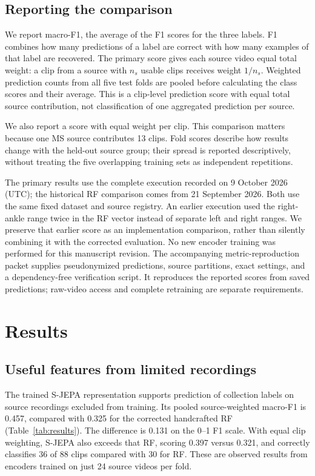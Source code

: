 \documentclass[10pt,twocolumn,letterpaper]{article}
\begin{document}
\subsection{Reporting the comparison}
We report macro-F1, the average of the F1 scores for the three labels. F1 combines how many predictions of a label are correct with how many examples of that label are recovered. The primary score gives each source video equal total weight: a clip from a source with $n_s$ usable clips receives weight $1/n_s$. Weighted prediction counts from all five test folds are pooled before calculating the class scores and their average. This is a clip-level prediction score with equal total source contribution, not classification of one aggregated prediction per source.

We also report a score with equal weight per clip. This comparison matters because one MS source contributes 13 clips. Fold scores describe how results change with the held-out source group; their spread is reported descriptively, without treating the five overlapping training sets as independent repetitions.

The primary results use the complete execution recorded on 9 October 2026 (UTC); the historical RF comparison comes from 21 September 2026. Both use the same fixed dataset and source registry. An earlier execution used the right-ankle range twice in the RF vector instead of separate left and right ranges. We preserve that earlier score as an implementation comparison, rather than silently combining it with the corrected evaluation. No new encoder training was performed for this manuscript revision. The accompanying metric-reproduction packet supplies pseudonymized predictions, source partitions, exact settings, and a dependency-free verification script. It reproduces the reported scores from saved predictions; raw-video access and complete retraining are separate requirements.

\section{Results}
\subsection{Useful features from limited recordings}
The trained S-JEPA representation supports prediction of collection labels on source recordings excluded from training. Its pooled source-weighted macro-F1 is 0.457, compared with 0.325 for the corrected handcrafted RF (Table~\ref{tab:results}). The difference is 0.131 on the 0--1 F1 scale. With equal clip weighting, S-JEPA also exceeds that RF, scoring 0.397 versus 0.321, and correctly classifies 36 of 88 clips compared with 30 for RF. These are observed results from encoders trained on just 24 source videos per fold.
\end{document}
